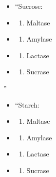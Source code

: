 \documentclass[
]{book}
\providecommand{\tightlist}{%
  \setlength{\itemsep}{0pt}\setlength{\parskip}{0pt}}
\begin{document}
\begin{itemize}
\item
  ``Sucrose:
\item
  \begin{enumerate}
  \def\labelenumi{(\Alph{enumi})}
  \tightlist
  \item
    Maltase\\
  \end{enumerate}
\item
  \begin{enumerate}
  \def\labelenumi{(\Alph{enumi})}
  \setcounter{enumi}{1}
  \tightlist
  \item
    Amylase\\
  \end{enumerate}
\item
  \begin{enumerate}
  \def\labelenumi{(\Alph{enumi})}
  \setcounter{enumi}{2}
  \tightlist
  \item
    Lactase\\
  \end{enumerate}
\item
  \begin{enumerate}
  \def\labelenumi{(\Alph{enumi})}
  \setcounter{enumi}{3}
  \tightlist
  \item
    Sucrase
  \end{enumerate}
\end{itemize}

''

\begin{itemize}
\item
  ``Starch:
\item
  \begin{enumerate}
  \def\labelenumi{(\Alph{enumi})}
  \tightlist
  \item
    Maltase\\
  \end{enumerate}
\item
  \begin{enumerate}
  \def\labelenumi{(\Alph{enumi})}
  \setcounter{enumi}{1}
  \tightlist
  \item
    Amylase\\
  \end{enumerate}
\item
  \begin{enumerate}
  \def\labelenumi{(\Alph{enumi})}
  \setcounter{enumi}{2}
  \tightlist
  \item
    Lactase\\
  \end{enumerate}
\item
  \begin{enumerate}
  \def\labelenumi{(\Alph{enumi})}
  \setcounter{enumi}{3}
  \tightlist
  \item
    Sucrase
  \end{enumerate}
\end{itemize}
\end{document}
